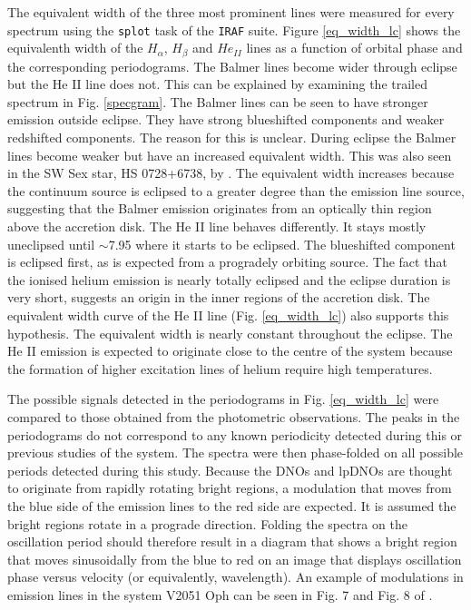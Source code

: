 The equivalent width of the three most prominent lines were measured for every spectrum using the \texttt{splot} task of the \texttt{IRAF} suite. Figure \ref{eq_width_lc} shows the equivalenth width of the $H_{\alpha}$, $H_{\beta}$ and $He_{II}$ lines as a function of orbital phase and the corresponding periodograms. The Balmer lines become wider through eclipse but the He II line does not. This can be explained by examining the trailed spectrum in Fig. \ref{specgram}. The Balmer lines can be seen to have stronger emission outside eclipse. They have strong blueshifted components and  weaker redshifted components. The reason for this is unclear. During eclipse the Balmer lines become weaker but have an increased equivalent width. This was also seen in the SW Sex star, HS 0728+6738, by \cite{2004A&A...424..647R}. The equivalent width increases because the continuum source is eclipsed to a greater degree than the emission line source, suggesting that the Balmer emission originates from an optically thin region above the accretion disk. The He II line behaves differently. It stays mostly uneclipsed until $\sim$7.95 where it starts to be eclipsed. The blueshifted component is eclipsed first, as is expected from a progradely orbiting source. The fact that the ionised helium emission is nearly totally eclipsed and the eclipse duration is very short, suggests an origin in the inner regions of the accretion disk. The equivalent width curve of the He II line (Fig. \ref{eq_width_lc}) also supports this hypothesis. The equivalent width is nearly constant throughout the eclipse. The He II emission is expected to originate close to the centre of the system because the formation of higher excitation lines of helium require high temperatures. 

The possible signals detected in the periodograms in Fig. \ref{eq_width_lc} were compared to those obtained from the photometric observations. The peaks in the periodograms do not correspond to any known periodicity detected during this or previous studies of the system. The spectra were then phase-folded on all possible periods detected during this study. Because the DNOs and lpDNOs are thought to originate from rapidly rotating bright regions, a modulation that moves from the blue side of the emission lines to the red side are expected. It is assumed the bright regions rotate in a prograde direction. Folding the spectra on the oscillation period should therefore result in a diagram that shows a bright region that moves sinusoidally from the blue to red on an image that displays oscillation phase versus velocity (or equivalently, wavelength). An example of modulations in emission lines in the system V2051 Oph can be seen in Fig. 7 and Fig. 8 of \cite{V2051Oph2001}. 

